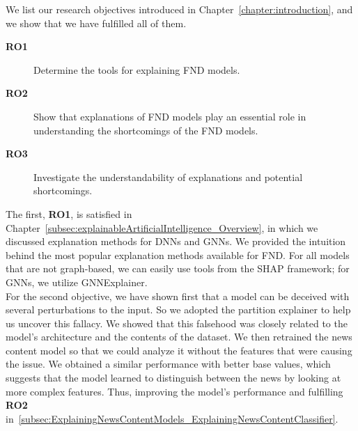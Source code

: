 We list our research objectives introduced in Chapter~\ref{chapter:introduction}, and we show that we have fulfilled all of them.
\begin{description}
    \item[\textbf{RO1}] Determine the tools for explaining FND models.
    \item[\textbf{RO2}] Show that explanations of FND models play an essential role in understanding the shortcomings of the FND models.
    \item[\textbf{RO3}] Investigate the understandability of explanations and potential shortcomings.
\end{description}
The first, \textbf{RO1}, is satisfied in Chapter~\ref{subsec:explainableArtificialIntelligence_Overview}, in which we discussed explanation methods for DNNs and GNNs. We provided the intuition behind the most popular explanation methods available for FND. For all models that are not graph-based, we can easily use tools from the SHAP framework; for GNNs, we utilize GNNExplainer. \\
For the second objective, we have shown first that a model can be deceived with several perturbations to the input. So we adopted the partition explainer to help us uncover this fallacy. We showed that this falsehood was closely related to the  model's architecture and the contents of the dataset. We then retrained the news content model so that we could analyze it without the features that were causing the issue. We obtained a similar performance with better base values, which suggests that the model learned to distinguish between the news by looking at more complex features. Thus, improving the model's performance and fulfilling \textbf{RO2} in~\ref{subsec:ExplainingNewsContentModels_ExplainingNewsContentClassifier}.\\
